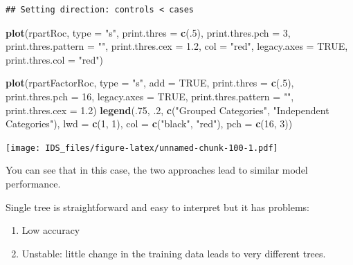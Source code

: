 \documentclass[12pt,]{krantz}
\makeatletter
\newenvironment{Shaded}{\begin{snugshade}}{\end{snugshade}}
\newcommand{\DataTypeTok}[1]{\textcolor[rgb]{0.27,0.27,0.27}{#1}}
\newcommand{\DecValTok}[1]{\textcolor[rgb]{0.06,0.06,0.06}{#1}}
\newcommand{\FloatTok}[1]{\textcolor[rgb]{0.06,0.06,0.06}{#1}}
\newcommand{\KeywordTok}[1]{\textcolor[rgb]{0.27,0.27,0.27}{\textbf{#1}}}
\newcommand{\NormalTok}[1]{#1}
\newcommand{\OtherTok}[1]{\textcolor[rgb]{0.37,0.37,0.37}{#1}}
\newcommand{\StringTok}[1]{\textcolor[rgb]{0.5,0.5,0.5}{#1}}
\providecommand{\tightlist}{%
  \setlength{\itemsep}{0pt}\setlength{\parskip}{0pt}}
\newenvironment{kframe}{%
\medskip{}
\setlength{\fboxsep}{.8em}
 \def\at@end@of@kframe{}%
 \ifinner\ifhmode%
  \def\at@end@of@kframe{\end{minipage}}%
  \begin{minipage}{\columnwidth}%
 \fi\fi%
 \def\FrameCommand##1{\hskip\@totalleftmargin \hskip-\fboxsep
 \colorbox{shadecolor}{##1}\hskip-\fboxsep
     \hskip-\linewidth \hskip-\@totalleftmargin \hskip\columnwidth}%
 \MakeFramed {\advance\hsize-\width
   \@totalleftmargin\z@ \linewidth\hsize
   \@setminipage}}%
 {\par\unskip\endMakeFramed%
 \at@end@of@kframe}
\renewenvironment{Shaded}{\begin{kframe}}{\end{kframe}}
\makeatother
\begin{document}
\begin{verbatim}
## Setting direction: controls < cases
\end{verbatim}

\begin{Shaded}
\begin{Highlighting}[]
\KeywordTok{plot}\NormalTok{(rpartRoc, }\DataTypeTok{type =} \StringTok{"s"}\NormalTok{, }\DataTypeTok{print.thres =} \KeywordTok{c}\NormalTok{(.}\DecValTok{5}\NormalTok{),}
     \DataTypeTok{print.thres.pch =} \DecValTok{3}\NormalTok{,}
     \DataTypeTok{print.thres.pattern =} \StringTok{""}\NormalTok{,}
     \DataTypeTok{print.thres.cex =} \FloatTok{1.2}\NormalTok{,}
     \DataTypeTok{col =} \StringTok{"red"}\NormalTok{, }\DataTypeTok{legacy.axes =} \OtherTok{TRUE}\NormalTok{,}
     \DataTypeTok{print.thres.col =} \StringTok{"red"}\NormalTok{)}

\KeywordTok{plot}\NormalTok{(rpartFactorRoc,}
     \DataTypeTok{type =} \StringTok{"s"}\NormalTok{,}
     \DataTypeTok{add =} \OtherTok{TRUE}\NormalTok{,}
     \DataTypeTok{print.thres =} \KeywordTok{c}\NormalTok{(.}\DecValTok{5}\NormalTok{),}
     \DataTypeTok{print.thres.pch =} \DecValTok{16}\NormalTok{, }\DataTypeTok{legacy.axes =} \OtherTok{TRUE}\NormalTok{,}
     \DataTypeTok{print.thres.pattern =} \StringTok{""}\NormalTok{,}
     \DataTypeTok{print.thres.cex =} \FloatTok{1.2}\NormalTok{)}
\KeywordTok{legend}\NormalTok{(.}\DecValTok{75}\NormalTok{, }\FloatTok{.2}\NormalTok{,}
       \KeywordTok{c}\NormalTok{(}\StringTok{"Grouped Categories"}\NormalTok{, }\StringTok{"Independent Categories"}\NormalTok{),}
       \DataTypeTok{lwd =} \KeywordTok{c}\NormalTok{(}\DecValTok{1}\NormalTok{, }\DecValTok{1}\NormalTok{),}
       \DataTypeTok{col =} \KeywordTok{c}\NormalTok{(}\StringTok{"black"}\NormalTok{, }\StringTok{"red"}\NormalTok{),}
       \DataTypeTok{pch =} \KeywordTok{c}\NormalTok{(}\DecValTok{16}\NormalTok{, }\DecValTok{3}\NormalTok{))}
\end{Highlighting}
\end{Shaded}

\texttt{[image: IDS\_files/figure-latex/unnamed-chunk-100-1.pdf]}

You can see that in this case, the two approaches lead to similar model performance.

Single tree is straightforward and easy to interpret but it has problems:

\begin{enumerate}
\def\labelenumi{\arabic{enumi}.}
\tightlist
\item
  Low accuracy
\item
  Unstable: little change in the training data leads to very different trees.
\end{enumerate}
\end{document}
